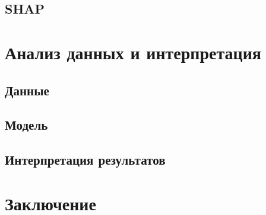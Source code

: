 \documentclass[a4paper, 12pt]{article}
\begin{document}
	\subsection{SHAP}
	
	\newpage

	\section{Анализ данных и интерпретация}
	
	\subsection{Данные}
	
	\subsection{Модель}
	
	\newpage
	\subsection{Интерпретация результатов}
	
	\newpage
	
	\section{Заключение}
	
	\newpage
	
\end{document}
